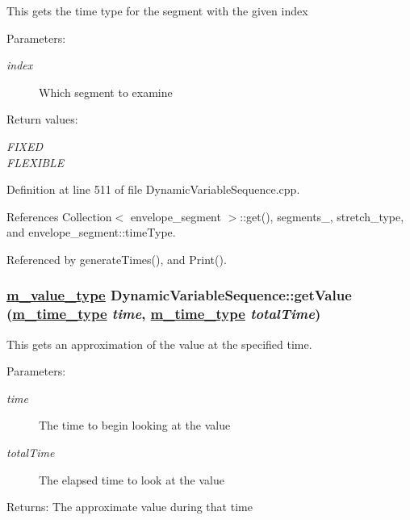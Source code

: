 This gets the time type for the segment with the given index \begin{Desc}
\item[Parameters:]
\begin{description}
\item[{\em index}]Which segment to examine \end{description}
\end{Desc}
\begin{Desc}
\item[Return values:]
\begin{description}
\item[{\em FIXED}]\item[{\em FLEXIBLE}]\end{description}
\end{Desc}


Definition at line 511 of file Dynamic\-Variable\-Sequence.cpp.

References Collection$<$ envelope\_\-segment $>$::get(), segments\_\-, stretch\_\-type, and envelope\_\-segment::time\-Type.

Referenced by generate\-Times(), and Print().\hypertarget{classDynamicVariableSequence_a5}{
\subsubsection[getValue]{\setlength{\rightskip}{0pt plus 5cm}\hyperlink{Types_8h_a3}{m\_\-value\_\-type} Dynamic\-Variable\-Sequence::get\-Value (\hyperlink{Types_8h_a2}{m\_\-time\_\-type} {\em time}, \hyperlink{Types_8h_a2}{m\_\-time\_\-type} {\em total\-Time})}}
\label{classDynamicVariableSequence_a5}


This gets an approximation of the value at the specified time. \begin{Desc}
\item[Parameters:]
\begin{description}
\item[{\em time}]The time to begin looking at the value \item[{\em total\-Time}]The elapsed time to look at the value \end{description}
\end{Desc}
\begin{Desc}
\item[Returns:]The approximate value during that time \end{Desc}



